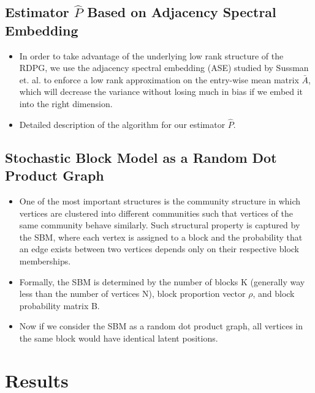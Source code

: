 \documentclass[a4paper]{article}
\begin{document}
\subsection{Estimator $\hat{P}$ Based on Adjacency Spectral Embedding}
\begin{itemize}
\item In order to take advantage of the underlying low rank structure of the RDPG, we use the adjacency spectral embedding (ASE) studied by Sussman et. al. to enforce a low rank approximation on the entry-wise mean matrix $\bar{A}$, which will decrease the variance without losing much in bias if we embed it into the right dimension.
\item Detailed description of the algorithm for our estimator $\hat{P}$.
\end{itemize}

\subsection{Stochastic Block Model as a Random Dot Product Graph}
\begin{itemize}
\item One of the most important structures is the community structure in which vertices are clustered into different communities such that vertices of the same community behave similarly. Such structural property is captured by the SBM, where each vertex is assigned to a block and the probability that an edge exists between two vertices depends only on their respective block memberships.
\item Formally, the SBM is determined by the number of blocks K (generally way less than the number of vertices N), block proportion vector $\rho$, and block probability matrix B.
\item Now if we consider the SBM as a random dot product graph, all vertices in the same block would have identical latent positions.
\end{itemize}


\section{Results}
\end{document}
